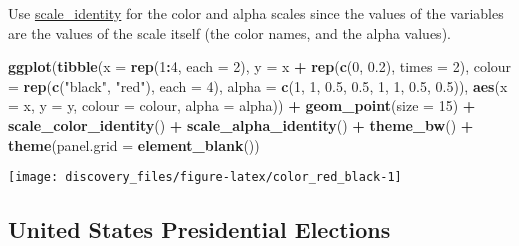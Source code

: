 \documentclass[]{book}
\newenvironment{Shaded}{\begin{snugshade}}{\end{snugshade}}
\newcommand{\DataTypeTok}[1]{\textcolor[rgb]{0.13,0.29,0.53}{#1}}
\newcommand{\DecValTok}[1]{\textcolor[rgb]{0.00,0.00,0.81}{#1}}
\newcommand{\FloatTok}[1]{\textcolor[rgb]{0.00,0.00,0.81}{#1}}
\newcommand{\KeywordTok}[1]{\textcolor[rgb]{0.13,0.29,0.53}{\textbf{#1}}}
\newcommand{\NormalTok}[1]{#1}
\newcommand{\OperatorTok}[1]{\textcolor[rgb]{0.81,0.36,0.00}{\textbf{#1}}}
\newcommand{\StringTok}[1]{\textcolor[rgb]{0.31,0.60,0.02}{#1}}
\theoremstyle{definition}
\theoremstyle{definition}
\theoremstyle{definition}
\theoremstyle{remark}
\begin{document}
Use
\href{http://docs.ggplot2.org/current/scale_identity.html}{scale\_identity}
for the color and alpha scales since the values of the variables are the
values of the scale itself (the color names, and the alpha values).

\begin{Shaded}
\begin{Highlighting}[]
\KeywordTok{ggplot}\NormalTok{(}\KeywordTok{tibble}\NormalTok{(}\DataTypeTok{x =} \KeywordTok{rep}\NormalTok{(}\DecValTok{1}\OperatorTok{:}\DecValTok{4}\NormalTok{, }\DataTypeTok{each =} \DecValTok{2}\NormalTok{),}
              \DataTypeTok{y =}\NormalTok{ x }\OperatorTok{+}\StringTok{ }\KeywordTok{rep}\NormalTok{(}\KeywordTok{c}\NormalTok{(}\DecValTok{0}\NormalTok{, }\FloatTok{0.2}\NormalTok{), }\DataTypeTok{times =} \DecValTok{2}\NormalTok{),}
              \DataTypeTok{colour =} \KeywordTok{rep}\NormalTok{(}\KeywordTok{c}\NormalTok{(}\StringTok{"black"}\NormalTok{, }\StringTok{"red"}\NormalTok{), }\DataTypeTok{each =} \DecValTok{4}\NormalTok{),}
              \DataTypeTok{alpha =} \KeywordTok{c}\NormalTok{(}\DecValTok{1}\NormalTok{, }\DecValTok{1}\NormalTok{, }\FloatTok{0.5}\NormalTok{, }\FloatTok{0.5}\NormalTok{, }\DecValTok{1}\NormalTok{, }\DecValTok{1}\NormalTok{, }\FloatTok{0.5}\NormalTok{, }\FloatTok{0.5}\NormalTok{)),}
  \KeywordTok{aes}\NormalTok{(}\DataTypeTok{x =}\NormalTok{ x, }\DataTypeTok{y =}\NormalTok{ y, }\DataTypeTok{colour =}\NormalTok{ colour, }\DataTypeTok{alpha =}\NormalTok{ alpha)) }\OperatorTok{+}
\StringTok{  }\KeywordTok{geom_point}\NormalTok{(}\DataTypeTok{size =} \DecValTok{15}\NormalTok{) }\OperatorTok{+}
\StringTok{  }\KeywordTok{scale_color_identity}\NormalTok{() }\OperatorTok{+}
\StringTok{  }\KeywordTok{scale_alpha_identity}\NormalTok{() }\OperatorTok{+}
\StringTok{  }\KeywordTok{theme_bw}\NormalTok{() }\OperatorTok{+}
\StringTok{  }\KeywordTok{theme}\NormalTok{(}\DataTypeTok{panel.grid =} \KeywordTok{element_blank}\NormalTok{())}
\end{Highlighting}
\end{Shaded}

\begin{center}\texttt{[image: discovery\_files/figure-latex/color\_red\_black-1]} \end{center}

\hypertarget{united-states-presidential-elections}{%
\subsection{United States Presidential
Elections}\label{united-states-presidential-elections}}
\end{document}
